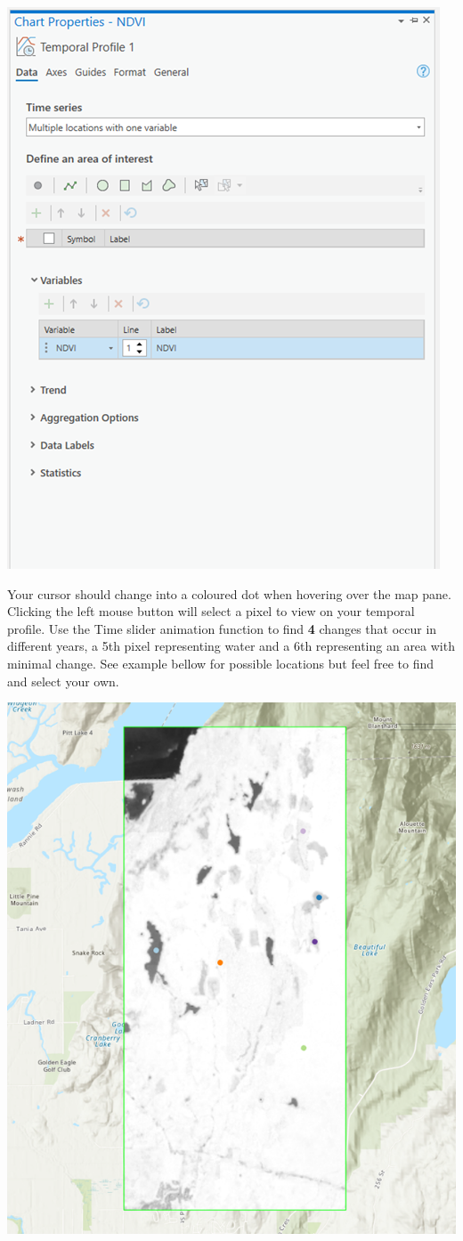 \documentclass[
]{book}
\begin{document}
\begin{center}\includegraphics[width=0.5\linewidth]{images/07-chart-properties-ndvi} \end{center}

Your cursor should change into a coloured dot when hovering over the map pane. Clicking the left mouse button will select a pixel to view on your temporal profile. Use the Time slider animation function to find \textbf{4} changes that occur in different years, a 5th pixel representing water and a 6th representing an area with minimal change. See example bellow for possible locations but feel free to find and select your own.

\begin{center}\includegraphics[width=0.7\linewidth]{images/07-example-of-aois-for-temporal-profile} \end{center}
\end{document}
